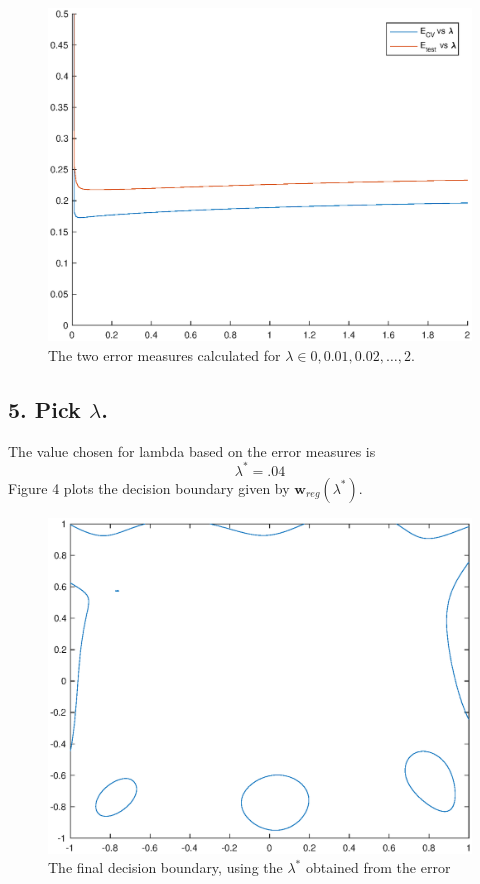 \documentclass{article}
\renewcommand{\vec}[1]{\mathbf{#1}}
\begin{document}
\begin{figure}[h!]
  \includegraphics[scale=.8]{errors}
  \caption{The two error measures calculated for $\lambda \in {0, 0.01, 0.02, \dots, 2}$.}
  \label{Fig 3.}
\end{figure}

\subsection*{5. Pick $\lambda$.}

The value chosen for lambda based on the error measures is $$\lambda^* = .04$$ Figure 4 plots
the decision boundary given by $\vec{w}_{reg}(\lambda^*)$.

\begin{figure}[h!]
  \includegraphics[scale=.8]{final}
  \caption{The final decision boundary, using the $\lambda^*$ obtained from the error}
  \label{Fig 4.}
\end{figure}
\end{document}
